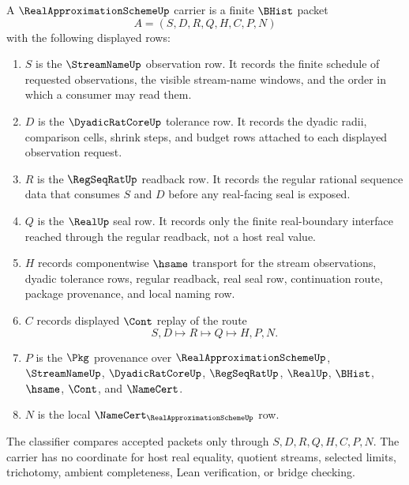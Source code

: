 \begin{definition}
\label{def:real-approximation-scheme-carrier}
A $\RealApproximationSchemeUp$ carrier is a finite $\BHist$ packet
$$
A=(S,D,R,Q,H,C,P,N)
$$
with the following displayed rows:
\begin{enumerate}
\item $S$ is the $\StreamNameUp$ observation row. It records the finite schedule of requested observations, the visible stream-name windows, and the order in which a consumer may read them.
\item $D$ is the $\DyadicRatCoreUp$ tolerance row. It records the dyadic radii, comparison cells, shrink steps, and budget rows attached to each displayed observation request.
\item $R$ is the $\RegSeqRatUp$ readback row. It records the regular rational sequence data that consumes $S$ and $D$ before any real-facing seal is exposed.
\item $Q$ is the $\RealUp$ seal row. It records only the finite real-boundary interface reached through the regular readback, not a host real value.
\item $H$ records componentwise $\hsame$ transport for the stream observations, dyadic tolerance rows, regular readback, real seal row, continuation route, package provenance, and local naming row.
\item $C$ records displayed $\Cont$ replay of the route
$$
S,D \longmapsto R \longmapsto Q \longmapsto H,P,N .
$$
\item $P$ is the $\Pkg$ provenance over $\RealApproximationSchemeUp$, $\StreamNameUp$, $\DyadicRatCoreUp$, $\RegSeqRatUp$, $\RealUp$, $\BHist$, $\hsame$, $\Cont$, and $\NameCert$.
\item $N$ is the local $\NameCert_{\RealApproximationSchemeUp}$ row.
\end{enumerate}
The classifier compares accepted packets only through $S,D,R,Q,H,C,P,N$. The carrier has no coordinate for host real equality, quotient streams, selected limits, trichotomy, ambient completeness, Lean verification, or bridge checking.
\end{definition}

